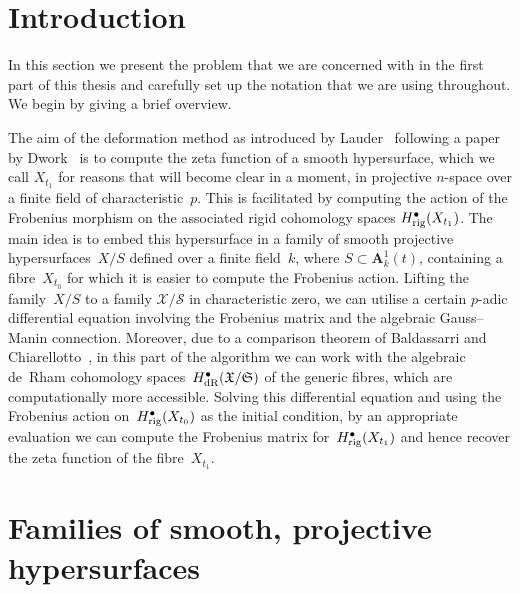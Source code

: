 

\section{Introduction}

In this section we present the problem that we are concerned with in 
the first part of this thesis and carefully set up the notation 
that we are using throughout.  We begin by giving a brief overview.

The aim of the deformation method as introduced by Lauder~\citep{Lau04} 
following a paper by Dwork~\citep{Dwork62b} is to compute the zeta function 
of a smooth hypersurface, which we call $X_{t_1}$ for reasons that will 
become clear in a moment, in projective $n$-space over a finite field of 
characteristic~$p$.  This is facilitated by computing the action of 
the Frobenius morphism on the associated rigid cohomology 
spaces $H_{\text{rig}}^{\bullet}(X_{t_1})$.  The main idea is to embed this 
hypersurface in a family of smooth projective hypersurfaces~$X/S$ 
defined over a finite field~$k$, where $S \subset \mathbf{A}_k^1(t)$, 
containing a fibre~$X_{t_0}$ for which it is easier to compute the Frobenius 
action. Lifting the family~$X/S$ to a family $\mathcal{X}/\mathcal{S}$ in 
characteristic zero, we can utilise a certain $p$-adic differential 
equation involving the Frobenius matrix and the algebraic Gauss--Manin 
connection.  Moreover, due to a comparison theorem of Baldassarri and 
Chiarellotto~\citep{BalChi94}, in this 
part of the algorithm we can work with the algebraic de~Rham cohomology 
spaces~$H_{\text{dR}}^{\bullet}(\mathfrak{X}/\mathfrak{S})$ of the generic 
fibres, which are computationally more accessible.  Solving this differential 
equation and using the Frobenius action on~$H_{\text{rig}}^{\bullet}(X_{t_0})$ 
as the initial condition, by an appropriate evaluation we can compute 
the Frobenius matrix for~$H_{\text{rig}}^{\bullet}(X_{t_1})$ and hence recover 
the zeta function of the fibre~$X_{t_1}$.


\section{Families of smooth, projective hypersurfaces}


